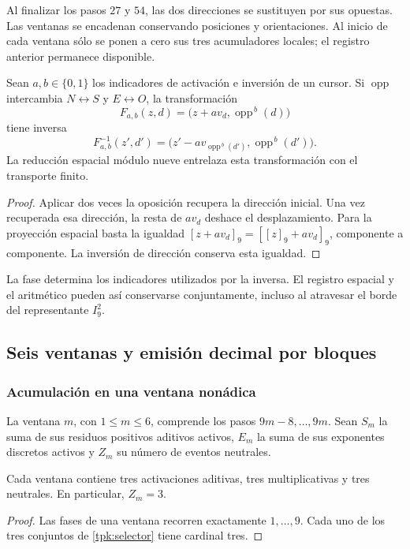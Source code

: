 Al finalizar los pasos \(27\) y \(54\), las dos direcciones se sustituyen
por sus opuestas. Las ventanas se encadenan conservando posiciones y
orientaciones. Al inicio de cada ventana sólo se ponen a cero sus tres
acumuladores locales; el registro anterior permanece disponible.

\begin{proposicion}
\label{tpk:inversion}
Sean \(a,b\in\{0,1\}\) los indicadores de activación e inversión de un
cursor. Si \(\operatorname{opp}\) intercambia \(N\leftrightarrow S\) y
\(E\leftrightarrow O\), la transformación
\[
 F_{a,b}(z,d)=\bigl(z+a v_d,\operatorname{opp}^{\,b}(d)\bigr)
\]
tiene inversa
\[
 F_{a,b}^{-1}(z',d')=
 \bigl(z'-a v_{\operatorname{opp}^{\,b}(d')},
       \operatorname{opp}^{\,b}(d')\bigr).
\]
La reducción espacial módulo nueve entrelaza esta transformación con el
transporte finito.
\end{proposicion}
\begin{proof}
Aplicar dos veces la oposición recupera la dirección inicial. Una vez
recuperada esa dirección, la resta de \(a v_d\) deshace el desplazamiento.
Para la proyección espacial basta la igualdad
\([z+a v_d]_9=[[z]_9+a v_d]_9\), componente a componente. La inversión de
dirección conserva esta igualdad.
\end{proof}

La fase determina los indicadores utilizados por la inversa. El registro
espacial y el aritmético pueden así conservarse conjuntamente, incluso al
atravesar el borde del representante \(I_9^2\).

\subsection{Seis ventanas y emisión decimal por bloques}
\label{tpk:emision}

\subsubsection{Acumulación en una ventana nonádica}

La ventana \(m\), con \(1\leq m\leq6\), comprende los pasos
\(9m-8,\ldots,9m\). Sean \(S_m\) la suma de sus residuos positivos
aditivos activos, \(E_m\) la suma de sus exponentes discretos activos y
\(Z_m\) su número de eventos neutrales.

\begin{lema}
\label{tpk:tres-eventos}
Cada ventana contiene tres activaciones aditivas, tres multiplicativas y
tres neutrales. En particular, \(Z_m=3\).
\end{lema}
\begin{proof}
Las fases de una ventana recorren exactamente \(1,\ldots,9\). Cada uno
de los tres conjuntos de \eqref{tpk:selector} tiene cardinal tres.
\end{proof}

